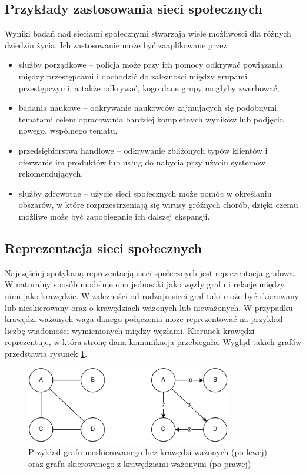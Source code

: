 \subsection{Przykłady zastosowania sieci społecznych}
Wyniki badań nad sieciami społecznymi stwarzają wiele możliwości dla różnych
dziedzin życia. Ich zastosowanie może być zaaplikowane przez:
\begin{itemize}
  \item służby porządkowe -- policja może przy ich pomocy odkrywać powiązania
  między przestępcami i dochodzić do zależności między grupami przestępczymi,
  a także odkrywać, kogo dane grupy mogłyby zwerbować, 
  \item badania naukowe -- odkrywanie naukowców zajmujących się podobnymi tematami
  celem opracowania bardziej kompletnych wyników lub podjęcia nowego,
  wspólnego tematu,
  \item przedsiębiorstwa handlowe -- odkrywanie zbliżonych typów klientów i 
  oferwanie im produktów lub usług do nabycia przy użyciu systemów rekomendujących,
  \item służby zdrowotne -- użycie sieci społecznych może pomóc w określaniu
  obszarów, w które rozprzestrzeniają się wirusy gróźnych chorób, dzięki czemu
  możliwe może być zapobieganie ich dalszej ekspansji.
\end{itemize}



\subsection{Reprezentacja sieci społecznych}
Najczęściej spotykaną reprezentacją sieci społecznych jest reprezentacja grafowa.
W naturalny sposób modeluje ona jednostki jako węzły grafu i relacje między nimi
jako krawędzie. W zależności od rodzaju sieci graf taki może być skierowany lub 
nieskierowany oraz o krawędziach ważonych lub nieważonych. W przypadku
krawędzi ważonych waga danego połączenia może reprezentować na przykład
liczbę wiadomości wymienionych między węzłami. Kierunek krawędzi reprezentuje,
w która stronę dana komunikacja przebiegała. Wygląd takich grafów przedstawia rysunek 
\ref{image:graf-reprezentacja}.

\begin{figure}[ht!]
\centering
\includegraphics[width=90mm]{img/graf-reprezentacja.png}
\caption{Przykład grafu nieskierowanego bez krawędzi ważonych (po lewej)
oraz grafu skierowanego z krawędziami ważonymi (po prawej)}
\label{image:graf-reprezentacja}
\end{figure}




